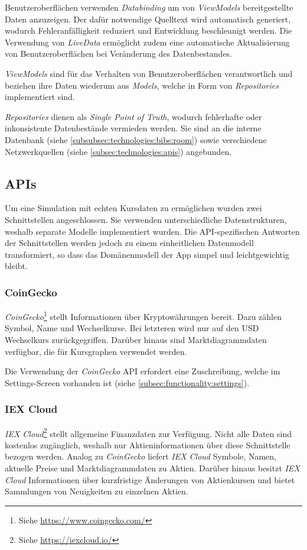\documentclass[a4paper]{article}
\begin{document}
Benutzeroberflächen verwenden \textit{Databinding} um von \textit{ViewModels} bereitgestellte Daten anzuzeigen.
Der dafür notwendige Quelltext wird automatisch generiert, wodurch Fehleranfälligkeit reduziert und Entwicklung beschleunigt werden.
Die Verwendung von \textit{LiveData} ermöglicht zudem eine automatische Aktualisierung von Benutzeroberflächen bei Veränderung des Datenbestandes.

\textit{ViewModels} sind für das Verhalten von Benutzeroberflächen verantwortlich und beziehen ihre Daten wiederum aus \textit{Models}, welche in Form von \textit{Repositories} implementiert sind.

\textit{Repositories} dienen als \textit{Single Point of Truth}, wodurch fehlerhafte oder inkonsistente Datenbestände vermieden werden.
Sie sind an die interne Datenbank (siehe \autoref{subsubsec:technologies:bibs:room}) sowie verschiedene Netzwerkquellen (siehe \autoref{subsec:technologies:apis}) angebunden.


\subsection{APIs}
\label{subsec:technologies:apis}
Um eine Simulation mit echten Kursdaten zu ermöglichen wurden zwei Schnittstellen angeschlossen.
Sie verwenden unterschiedliche Datenstrukturen, weshalb separate Modelle implementiert wurden.
Die API-spezifischen Antworten der Schnittstellen werden jedoch zu einem einheitlichen Datenmodell transformiert, so dass das Domänenmodell der App simpel und leichtgewichtig bleibt.


\subsubsection{CoinGecko}
\label{subsubsec:technologies:apis:coingecko}
\textit{CoinGecko}\footnote{Siehe \url{https://www.coingecko.com/}} stellt Informationen über Kryptowährungen bereit.
Dazu zählen Symbol, Name und Wechselkurse.
Bei letzteren wird nur auf den USD Wechselkurs zurückgegriffen.
Darüber hinaus sind Marktdiagrammdaten verfügbar, die für Kursgraphen verwendet werden.

Die Verwendung der \textit{CoinGecko} API erfordert eine Zuschreibung, welche im Settings-Screen vorhanden ist (siehe \autoref{subsec:functionality:settings}).

\subsubsection{IEX Cloud}
\label{subsubsec:technologies:apis:iex}
\textit{IEX Cloud}\footnote{Siehe \url{https://iexcloud.io/}} stellt allgemeine Finanzdaten zur Verfügung.
Nicht alle Daten sind kostenlos zugänglich, weshalb nur Aktieninformationen über diese Schnittstelle bezogen werden.
Analog zu \textit{CoinGecko} liefert \textit{IEX Cloud} Symbole, Namen, aktuelle Preise und Marktdiagrammdaten zu Aktien.
Darüber hinaus besitzt \textit{IEX Cloud} Informationen über kurzfristige Änderungen von Aktienkursen und bietet Sammlungen von Neuigkeiten zu einzelnen Aktien.
\end{document}
